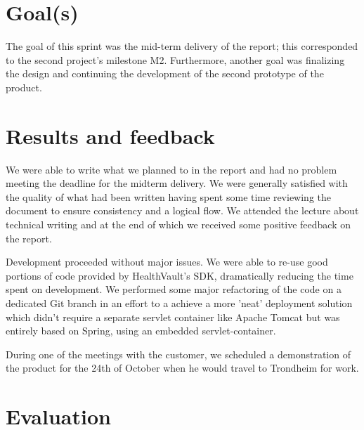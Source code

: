 \fi

\section{Goal(s)}

The goal of this sprint was the mid-term delivery of the report; this corresponded to
the second project's milestone M2. Furthermore, another goal was finalizing the design and continuing
the development of the second prototype of the product.%


\section{Results and feedback}

We were able to write what we planned to in the report and had no problem meeting the deadline for the midterm delivery. 
We were generally satisfied with the quality of what had been written having spent some time reviewing the document to ensure consistency and a logical flow.
We attended the lecture about technical writing and at the end of which we received some positive feedback on the report.

Development proceeded without major issues. 
We were able to re-use good portions of code provided by HealthVault's SDK, dramatically reducing the time spent on development.
We performed some major refactoring of the code on a dedicated Git branch in an effort to a achieve a more 'neat' deployment solution which didn't require a separate servlet container like Apache Tomcat but was entirely based on Spring, using an embedded servlet-container.

During one of the meetings with the customer, we scheduled a demonstration of the product for the 24th of October when he would travel to Trondheim for work.

\section{Evaluation}

